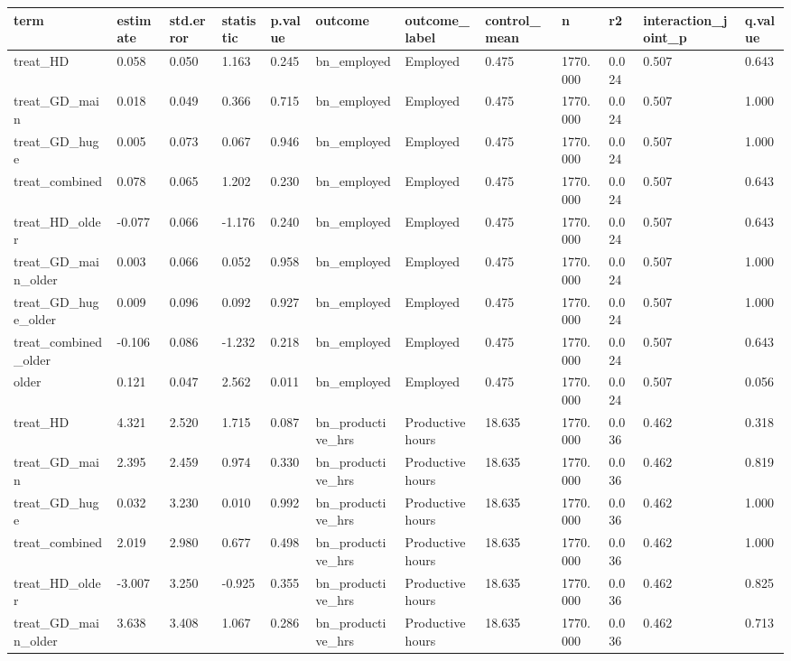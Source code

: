 \begin{tabular}{llllllllllll}
\toprule
term & estimate & std.error & statistic & p.value & outcome & outcome\_label & control\_mean & n & r2 & interaction\_joint\_p & q.value
 \\
\midrule
treat\_HD & 0.058 & 0.050 & 1.163 & 0.245 & bn\_employed & Employed & 0.475 & 1770.000 & 0.024 & 0.507 & 0.643 \\
treat\_GD\_main & 0.018 & 0.049 & 0.366 & 0.715 & bn\_employed & Employed & 0.475 & 1770.000 & 0.024 & 0.507 & 1.000 \\
treat\_GD\_huge & 0.005 & 0.073 & 0.067 & 0.946 & bn\_employed & Employed & 0.475 & 1770.000 & 0.024 & 0.507 & 1.000 \\
treat\_combined & 0.078 & 0.065 & 1.202 & 0.230 & bn\_employed & Employed & 0.475 & 1770.000 & 0.024 & 0.507 & 0.643 \\
treat\_HD\_older & -0.077 & 0.066 & -1.176 & 0.240 & bn\_employed & Employed & 0.475 & 1770.000 & 0.024 & 0.507 & 0.643 \\
treat\_GD\_main\_older & 0.003 & 0.066 & 0.052 & 0.958 & bn\_employed & Employed & 0.475 & 1770.000 & 0.024 & 0.507 & 1.000 \\
treat\_GD\_huge\_older & 0.009 & 0.096 & 0.092 & 0.927 & bn\_employed & Employed & 0.475 & 1770.000 & 0.024 & 0.507 & 1.000 \\
treat\_combined\_older & -0.106 & 0.086 & -1.232 & 0.218 & bn\_employed & Employed & 0.475 & 1770.000 & 0.024 & 0.507 & 0.643 \\
older & 0.121 & 0.047 & 2.562 & 0.011 & bn\_employed & Employed & 0.475 & 1770.000 & 0.024 & 0.507 & 0.056 \\
treat\_HD & 4.321 & 2.520 & 1.715 & 0.087 & bn\_productive\_hrs & Productive hours & 18.635 & 1770.000 & 0.036 & 0.462 & 0.318 \\
treat\_GD\_main & 2.395 & 2.459 & 0.974 & 0.330 & bn\_productive\_hrs & Productive hours & 18.635 & 1770.000 & 0.036 & 0.462 & 0.819 \\
treat\_GD\_huge & 0.032 & 3.230 & 0.010 & 0.992 & bn\_productive\_hrs & Productive hours & 18.635 & 1770.000 & 0.036 & 0.462 & 1.000 \\
treat\_combined & 2.019 & 2.980 & 0.677 & 0.498 & bn\_productive\_hrs & Productive hours & 18.635 & 1770.000 & 0.036 & 0.462 & 1.000 \\
treat\_HD\_older & -3.007 & 3.250 & -0.925 & 0.355 & bn\_productive\_hrs & Productive hours & 18.635 & 1770.000 & 0.036 & 0.462 & 0.825 \\
treat\_GD\_main\_older & 3.638 & 3.408 & 1.067 & 0.286 & bn\_productive\_hrs & Productive hours & 18.635 & 1770.000 & 0.036 & 0.462 & 0.713 \\

\end{tabular}
